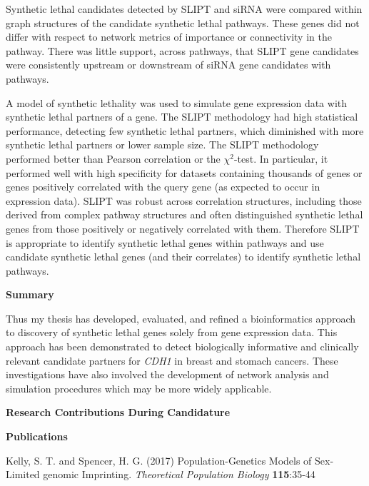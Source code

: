 Synthetic lethal candidates detected by \acrshort{SLIPT} and \acrshort{siRNA} were compared within graph structures of the candidate synthetic lethal pathways. These genes did not differ with respect to network metrics of importance or connectivity in the pathway. There was little support, across pathways, that \acrshort{SLIPT} gene candidates were consistently upstream or downstream of \acrshort{siRNA} gene candidates with pathways. 


A model of synthetic lethality was used to simulate gene expression data with synthetic lethal partners of a gene. The \acrshort{SLIPT} methodology had high statistical performance, detecting few synthetic lethal partners, which diminished with more synthetic lethal partners or lower sample size. The \acrshort{SLIPT} methodology performed better than Pearson correlation or the $\chi^2$-test. In particular, it performed well with high specificity for datasets containing thousands of genes or genes positively correlated with the query gene (as expected to occur in expression data). \acrshort{SLIPT} was robust across correlation structures, including those derived from complex pathway structures and often distinguished synthetic lethal genes from those positively or negatively correlated with them. Therefore \acrshort{SLIPT} is appropriate to identify synthetic lethal genes within pathways and use candidate synthetic lethal genes (and their correlates) to identify synthetic lethal pathways.

\clearpage
\textbf{Summary}

Thus my thesis has developed, evaluated, and refined a bioinformatics approach to discovery of synthetic lethal genes solely from gene expression data. This approach has been demonstrated to detect biologically informative and clinically relevant candidate partners for \textit{CDH1} in breast and stomach cancers. These investigations have also involved the development of network analysis and simulation procedures which may be more widely applicable.

\clearpage

\begin{center}
 \textbf{Research Contributions During Candidature}
\end{center}

\textbf{Publications}

\begin{small} \begin{flushleft} Kelly, S. T. and Spencer, H. G. (2017) Population-Genetics Models of Sex-Limited \Gls{genomic} Imprinting. \textit{Theoretical Population Biology} \textbf{115}:35-44  \end{flushleft} \end{small}

